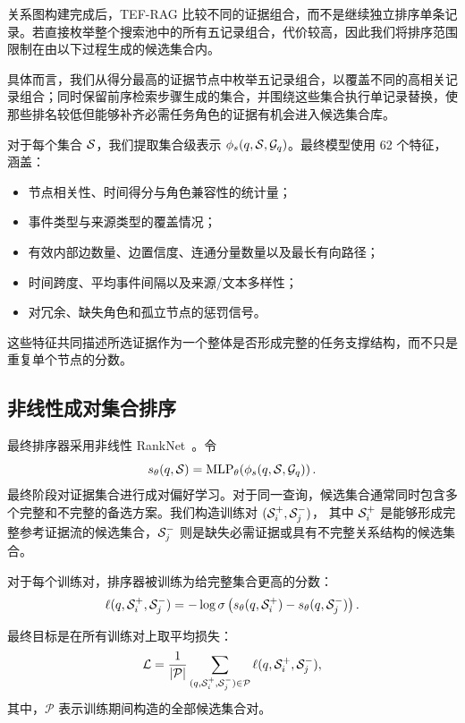 关系图构建完成后，TEF-RAG 比较不同的证据组合，而不是继续独立排序单条记录。若直接枚举整个搜索池中的所有五记录组合，代价较高，因此我们将排序范围限制在由以下过程生成的候选集合内。

具体而言，我们从得分最高的证据节点中枚举五记录组合，以覆盖不同的高相关记录组合；同时保留前序检索步骤生成的集合，并围绕这些集合执行单记录替换，使那些排名较低但能够补齐必需任务角色的证据有机会进入候选集合库。

对于每个集合 $\mathcal{S}$，我们提取集合级表示 $\phi_s(q,\mathcal{S},\mathcal{G}_q)$。最终模型使用 62 个特征，涵盖：
\begin{itemize}
    \item 节点相关性、时间得分与角色兼容性的统计量；
    \item 事件类型与来源类型的覆盖情况；
    \item 有效内部边数量、边置信度、连通分量数量以及最长有向路径；
    \item 时间跨度、平均事件间隔以及来源/文本多样性；
    \item 对冗余、缺失角色和孤立节点的惩罚信号。
\end{itemize}
这些特征共同描述所选证据作为一个整体是否形成完整的任务支撑结构，而不只是重复单个节点的分数。

\subsection{非线性成对集合排序}

最终排序器采用非线性 RankNet~\cite{burges2005ranknet}。令
\begin{equation}
s_{\theta}(q,\mathcal{S})
=
\operatorname{MLP}_{\theta}
\!\left(
\phi_s(q,\mathcal{S},\mathcal{G}_q)
\right).
\end{equation}
最终阶段对证据集合进行成对偏好学习。对于同一查询，候选集合通常同时包含多个完整和不完整的备选方案。我们构造训练对
$(\mathcal{S}_i^+,\mathcal{S}_j^-)$，
其中 $\mathcal{S}_i^+$ 是能够形成完整参考证据流的候选集合，$\mathcal{S}_j^-$ 则是缺失必需证据或具有不完整关系结构的候选集合。

对于每个训练对，排序器被训练为给完整集合更高的分数：
\begin{equation}
\ell(q,\mathcal{S}_i^+,\mathcal{S}_j^-)
=
-\log \sigma\left(
s_{\theta}(q,\mathcal{S}_i^+)
-
s_{\theta}(q,\mathcal{S}_j^-)
\right).
\label{eq:ranknet_pair_loss}
\end{equation}

最终目标是在所有训练对上取平均损失：
\begin{equation}
\mathcal{L}
=
\frac{1}{|\mathcal{P}|}
\sum_{(q,\mathcal{S}_i^+,\mathcal{S}_j^-)\in\mathcal{P}}
\ell(q,\mathcal{S}_i^+,\mathcal{S}_j^-),
\label{eq:ranknet_loss}
\end{equation}
其中，$\mathcal{P}$ 表示训练期间构造的全部候选集合对。

